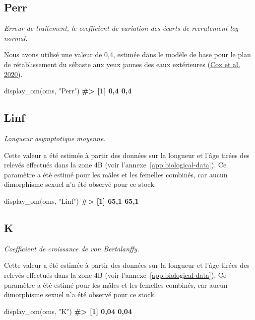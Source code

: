 \documentclass[french,11pt]{book}
\newenvironment{Shaded}{\begin{snugshade}}{\end{snugshade}}
\newcommand{\CommentTok}[1]{\textcolor[rgb]{0.56,0.35,0.01}{\textbf{#1}}}
\newcommand{\FunctionTok}[1]{\textcolor[rgb]{0.00,0.00,0.00}{#1}}
\newcommand{\NormalTok}[1]{#1}
\newcommand{\StringTok}[1]{\textcolor[rgb]{0.31,0.60,0.02}{#1}}
\begin{document}
\subsection{Perr}
\label{app:desc-stock-perr-yelloweye}

\emph{Erreur de traitement, le coefficient de variation des écarts de recrutement log-normal.}

Nous avons utilisé une valeur de 0,4, estimée dans le modèle de base pour le plan de rétablissement du sébaste aux yeux jaunes des eaux extérieures (\protect\hyperlink{ref-cox2020}{Cox et al. 2020}).
\begin{Shaded}
\begin{Highlighting}[]
\FunctionTok{display\_om}\NormalTok{(oms, }\StringTok{"Perr"}\NormalTok{)}
\CommentTok{\#\textgreater{} [1] 0,4 0,4}
\end{Highlighting}
\end{Shaded}
\subsection{Linf}
\label{app:desc-stock-linf-yelloweye}

\emph{Longueur asymptotique moyenne.}

Cette valeur a été estimée à partir des données sur la longueur et l'âge tirées des relevés effectués dans la zone 4B (voir l'annexe~\ref{app:biological-data}). Ce paramètre a été estimé pour les mâles et les femelles combinés, car aucun dimorphisme sexuel n'a été observé pour ce stock.
\begin{Shaded}
\begin{Highlighting}[]
\FunctionTok{display\_om}\NormalTok{(oms, }\StringTok{"Linf"}\NormalTok{)}
\CommentTok{\#\textgreater{} [1] 65,1 65,1}
\end{Highlighting}
\end{Shaded}
\subsection{K}
\label{app:desc-stock-k-yelloweye}

\emph{Coefficient de croissance de von Bertalanffy.}

Cette valeur a été estimée à partir des données sur la longueur et l'âge tirées des relevés effectués dans la zone 4B (voir l'annexe~\ref{app:biological-data}). Ce paramètre a été estimé pour les mâles et les femelles combinés, car aucun dimorphisme sexuel n'a été observé pour ce stock.
\begin{Shaded}
\begin{Highlighting}[]
\FunctionTok{display\_om}\NormalTok{(oms, }\StringTok{"K"}\NormalTok{)}
\CommentTok{\#\textgreater{} [1] 0,04 0,04}
\end{Highlighting}
\end{Shaded}
\end{document}
